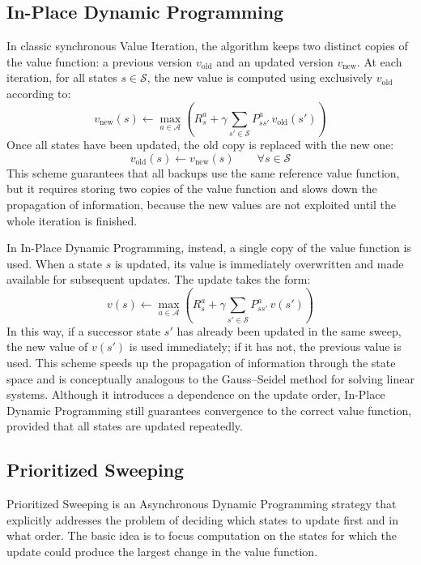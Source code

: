 \subsection{In-Place Dynamic Programming}

In classic synchronous Value Iteration, the algorithm keeps two distinct copies of the value function: a previous version $v_{\text{old}}$ and an updated version $v_{\text{new}}$. At each iteration, for all states $s \in \mathcal{S}$, the new value is computed using exclusively $v_{\text{old}}$ according to:
\[
v_{\text{new}}(s) \leftarrow \max_{a \in \mathcal{A}} \left( R_s^a + \gamma \sum_{s' \in \mathcal{S}} P_{ss'}^a \, v_{\text{old}}(s') \right)
\]
Once all states have been updated, the old copy is replaced with the new one:
\[
v_{\text{old}}(s) \leftarrow v_{\text{new}}(s) \qquad \forall s \in \mathcal{S}
\]
This scheme guarantees that all backups use the same reference value function, but it requires storing two copies of the value function and slows down the propagation of information, because the new values are not exploited until the whole iteration is finished.

In In-Place Dynamic Programming, instead, a single copy of the value function is used. When a state $s$ is updated, its value is immediately overwritten and made available for subsequent updates. The update takes the form:
\[
v(s) \leftarrow \max_{a \in \mathcal{A}} \left( R_s^a + \gamma \sum_{s' \in \mathcal{S}} P_{ss'}^a \, v(s') \right)
\]
In this way, if a successor state $s'$ has already been updated in the same sweep, the new value of $v(s')$ is used immediately; if it has not, the previous value is used. This scheme speeds up the propagation of information through the state space and is conceptually analogous to the Gauss--Seidel method for solving linear systems. Although it introduces a dependence on the update order, In-Place Dynamic Programming still guarantees convergence to the correct value function, provided that all states are updated repeatedly.



\subsection{Prioritized Sweeping}

Prioritized Sweeping is an Asynchronous Dynamic Programming strategy that explicitly addresses the problem of deciding which states to update first and in what order. The basic idea is to focus computation on the states for which the update could produce the largest change in the value function.

